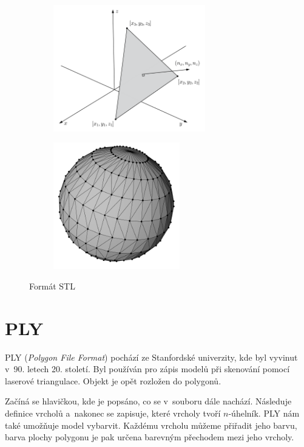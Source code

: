 \documentclass[12pt]{report}			%
\begin{document}
                \begin{figure}[h]
                    \centering
                    \begin{subfigure}{7cm}
                        \centering
                        \includegraphics[height=5.5cm]{images/triangle.pdf}
                    \end{subfigure}
                    \hfill
                    \begin{subfigure}{7cm}
                        \centering
                        \includegraphics[height=5.5cm]{images/sphereSTL.pdf}
                    \end{subfigure}
                    \caption{Formát STL}
                    \label{fig:my_label}
                \end{figure}


            \section{PLY}
                PLY (\emph{Polygon File Format}) pochází ze Stanfordské univerzity, kde byl vyvinut v~90. letech 20. století. Byl používán pro zápis modelů při skenování pomocí laserové triangulace. Objekt je opět rozložen do polygonů.\cite{sustainabilityofdigitalformatsply}

                Začíná se hlavičkou, kde je popsáno, co se v~souboru dále nachází. Následuje definice vrcholů a~nakonec se zapisuje, které vrcholy tvoří $n$-úhelník. PLY nám také umožňuje model vybarvit. Každému vrcholu můžeme přiřadit jeho barvu, barva plochy polygonu je pak určena barevným přechodem mezi jeho vrcholy. \cite{ply}
\end{document}
